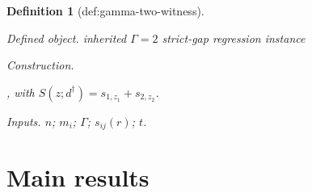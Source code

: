 \documentclass{article}
\newtheorem{definition}{Definition}
\begin{document}
\begin{definition}[def:gamma-two-witness]\label{def:gamma-two-witness}
\par\smallskip\noindent\emph{Defined object.} inherited \(\Gamma=2\) strict-gap regression instance
\par\smallskip\noindent\emph{Construction.} \par\noindent {}\par\noindent, with \(S(z;d^\dagger)=s_{1,z_1}+s_{2,z_2}\).
\par\smallskip\noindent\emph{Inputs.} \(n\); \(m_i\); \(\Gamma\); \(s_{ij}(r)\); \(t\).
\end{definition}

\section{Main results}
\end{document}
